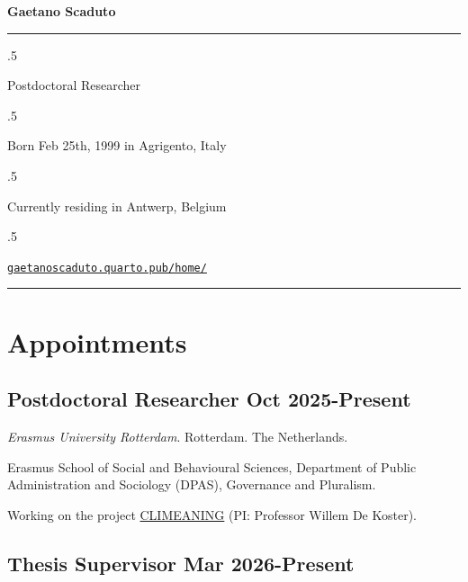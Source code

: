 \documentclass[10pt,]{article}
\providecommand{\tightlist}{%
  \setlength{\itemsep}{0pt}\setlength{\parskip}{0pt}}
\renewenvironment{itemize}{
  \begin{list}{}{
    \setlength{\leftmargin}{1.5em}
  }
}{
  \end{list}
}
\begin{document}
\centerline{\huge \bf Gaetano Scaduto}

\vspace{2 mm}

\hrule

\vspace{2 mm}

\moveleft.5\hoffset\centerline{Postdoctoral Researcher}
\moveleft.5\hoffset\centerline{Born Feb 25th, 1999 in Agrigento, Italy}
\moveleft.5\hoffset\centerline{Currently residing in Antwerp, Belgium}
\moveleft.5\hoffset\centerline{       \faGlobe \hspace{1 mm} \href{http://gaetanoscaduto.quarto.pub/home/}{\tt gaetanoscaduto.quarto.pub/home/}   } 

\vspace{2 mm}

\hrule


\section{Appointments}\label{appointments}

\subsection{\texorpdfstring{Postdoctoral Researcher \hfill Oct
2025-Present}{Postdoctoral Researcher Oct 2025-Present}}\label{postdoctoral-researcher-oct-2025-present}

\begin{itemize}
\item
  \emph{Erasmus University Rotterdam}. Rotterdam. The Netherlands.

  \begin{itemize}
  \tightlist
  \item
    Erasmus School of Social and Behavioural Sciences, Department of
    Public Administration and Sociology (DPAS), Governance and
    Pluralism.
  \item
    Working on the project
    \href{https://www.nwo.nl/en/projects/domyz32585}{CLIMEANING} (PI:
    Professor Willem De Koster).
  \end{itemize}
\end{itemize}

\subsection{\texorpdfstring{Thesis Supervisor \hfill Mar
2026-Present}{Thesis Supervisor Mar 2026-Present}}\label{thesis-supervisor-mar-2026-present}
\end{document}
